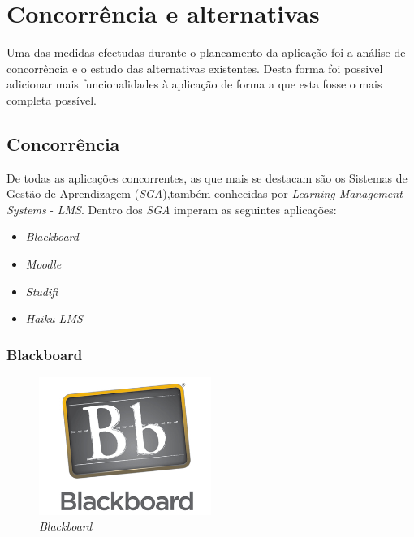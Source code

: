 \section{Concorrência e alternativas}

Uma das medidas efectudas durante o planeamento da aplicação foi a análise de concorrência e o estudo das alternativas existentes. Desta forma foi possivel adicionar mais funcionalidades à aplicação de forma a que esta fosse o mais completa possível.

\subsection{Concorrência} %
\label{sub:concorrencia}

De todas as aplicações concorrentes, as que mais se destacam são os Sistemas de Gestão de Aprendizagem (\emph{SGA}),também conhecidas por \emph{Learning Management Systems} - \emph{LMS}. Dentro dos \emph{SGA} imperam as seguintes aplicações:
\begin{itemize}
	\item \emph{Blackboard}
	\item \emph{Moodle}
	\item \emph{Studifi}
	\item \emph{Haiku LMS}
\end{itemize}

\subsubsection{Blackboard} %
\label{ssub:blackboard}

\begin{figure}[H]
        \centering
        \includegraphics[width=0.5\textwidth]{images/concorrencia/blackboard.jpg}
         \caption{\emph{Blackboard}}
         \label{fig: blackboard}
\end{figure}

